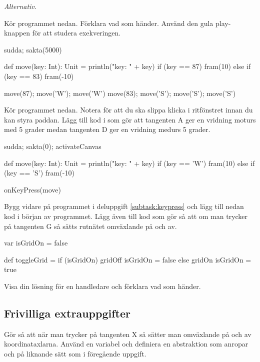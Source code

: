 \Task \emph{Alternativ.}

\Subtask Kör programmet nedan. Förklara vad som händer. Använd den gula play-knappen för att studera exekveringen.

\begin{Code}
sudda; sakta(5000)

def move(key: Int): Unit = {
  println("key: " + key)
  if (key == 87) fram(10)
  else if (key == 83) fram(-10)
}

move(87); move('W'); move('W')
move(83); move('S'); move('S'); move('S')
\end{Code}

\Subtask \label{subtask:keypress}  Kör programmet nedan. Notera  för att du ska slippa klicka i ritfönstret innan du kan styra paddan. Lägg till kod i  som gör att tangenten A ger en vridning moturs med 5 grader medan tangenten D ger en vridning medurs 5 grader.

\begin{Code}
sudda; sakta(0); activateCanvas

def move(key: Int): Unit = {
  println("key: " + key)
  if (key == 'W') fram(10)
  else if (key == 'S') fram(-10)
}

onKeyPress(move)
\end{Code}

\Subtask Bygg vidare på programmet i deluppgift \ref{subtask:keypress} och lägg till nedan kod i början av programmet. Lägg även till kod som gör så att om man trycker på tangenten G så sätts rutnätet omväxlande på och av.

\begin{Code}
var isGridOn = false

def toggleGrid =
  if (isGridOn) {
    gridOff
    isGridOn = false
  } else {
    gridOn
    isGridOn = true
  }
\end{Code}

\Subtask\Checkpoint Visa din lösning för en handledare och förklara vad som händer.

\subsection{Frivilliga extrauppgifter}

\Task Gör så att när man trycker på tangenten X så sätter man omväxlande på och av koordinataxlarna. Använd en variabel  och definiera en abstraktion  som anropar  och  på liknande sätt som i föregående uppgift. 


